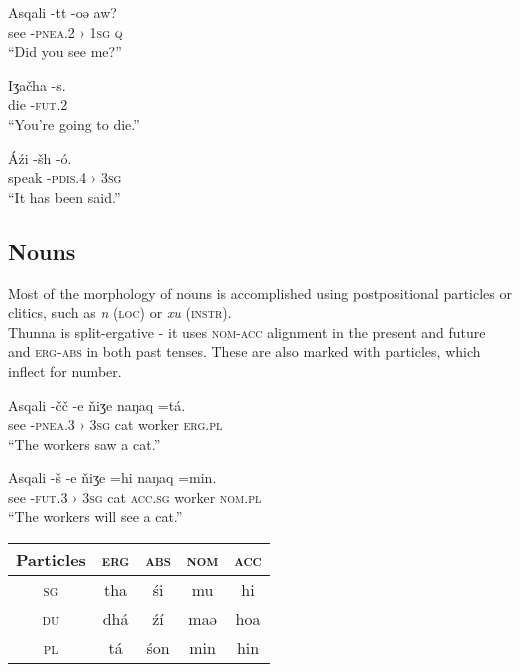 \documentclass[11pt]{article} %
\begin{document}
\begin{exe}  
  \ex
  \gll Asqali  -tt                -oə          aw?        \\
	   see     -\textsc{pnea.2 ›} \textsc{1sg} \textsc{q} \\
  \glt ``Did you see me?''
  
  \ex
  \gll Iʒačha  -s.              \\
	   die     -\textsc{fut.2}  \\
  \glt ``You're going to die.''
	
  \ex
  \gll Áźi   -šh                -ó.           \\ %
	   speak -\textsc{pdis.4 ›} \textsc{3sg}  \\ %
  \glt ``It has been said.''
\end{exe}

\subsection{Nouns}

Most of the morphology of nouns is accomplished using postpositional particles or clitics, such as \textit{n} (\textsc{loc}) or \textit{xu} (\textsc{instr}).\\
Thunna is split-ergative - it uses \textsc{nom-acc} alignment in the present and future and \textsc{erg-abs} in both past tenses. These are also marked with particles, which inflect for number.
\begin{exe}  
  \ex
  \gll Asqali  -čč                -e           ňiʒe naŋaq  =tá.            \\   %
	   see     -\textsc{pnea.3 ›} \textsc{3sg} cat  worker \textsc{erg.pl} \\
  \glt ``The workers saw a cat.''
  
    \ex
  \gll Asqali  -š                 -e           ňiʒe =hi             naŋaq  =min.            \\            %
	   see     -\textsc{fut.3 ›}  \textsc{3sg} cat  \textsc{acc.sg} worker \textsc{nom.pl} \\
  \glt ``The workers will see a cat.''
\end{exe}

\begin{center}
	\begin{tabular}{|c||c|c|c|c|}
				\hline
				\textbf{Particles} & \textsc{erg} & \textsc{abs} & \textsc{nom} & \textsc{acc} \\ \hline\hline
				\textsc{sg}        & tha          & śi           & mu           & hi           \\ \hline
				\textsc{du}        & dhá          & źí           & maə          & hoa          \\ \hline
				\textsc{pl}        & tá           & śon          & min          & hin          \\ \hline 
	\end{tabular} 
\end{center}
\end{document}
